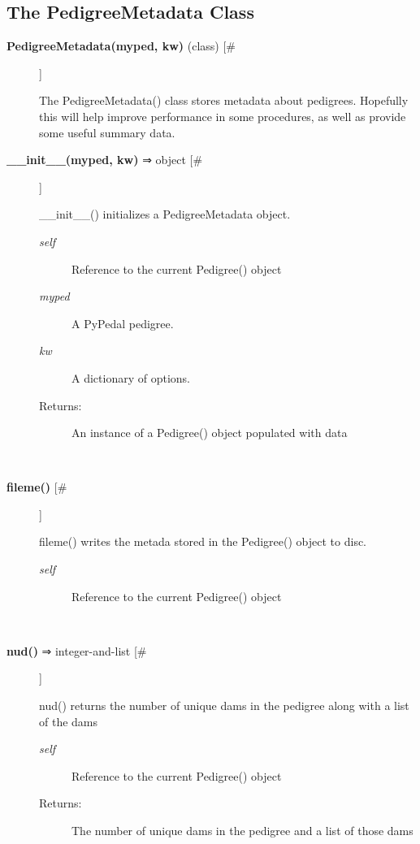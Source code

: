\documentclass[10pt]{article}
\begin{document}
\subsection*{The PedigreeMetadata Class}
\begin{description}
\item[\textbf{PedigreeMetadata(myped, kw)}
 (class) [\#]]

 The PedigreeMetadata() class stores metadata about pedigrees. Hopefully this will help improve performance in some procedures, as well as provide some useful summary data.

\item[\textbf{\_\_init\_\_(myped, kw)}
 ⇒ object [\#]]

 \_\_init\_\_() initializes a PedigreeMetadata object.
\begin{description}
\item[\emph{self}
] Reference to the current Pedigree() object
\item[\emph{myped}
] A PyPedal pedigree.
\item[\emph{kw}
] A dictionary of options.
\item[Returns:] An instance of a Pedigree() object populated with data

\end{description}
\\ 

\item[\textbf{fileme()}
 [\#]]

 fileme() writes the metada stored in the Pedigree() object to disc.
\begin{description}
\item[\emph{self}
] Reference to the current Pedigree() object

\end{description}
\\ 

\item[\textbf{nud()}
 ⇒ integer-and-list [\#]]

 nud() returns the number of unique dams in the pedigree along with a list of the dams
\begin{description}
\item[\emph{self}
] Reference to the current Pedigree() object
\item[Returns:] The number of unique dams in the pedigree and a list of those dams

\end{description}
\\ 


\end{description}
\end{document}
